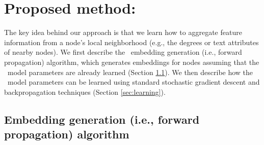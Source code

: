 
\section{Proposed method: \name}


The key idea behind our approach is that we learn how to aggregate feature information from a node's local neighborhood (e.g., the degrees or text attributes of nearby nodes). 
We first describe the  \name\ embedding generation (i.e., forward propagation) algorithm, which generates embeddings for nodes assuming that the \name\ model parameters are already learned (Section \ref{sec:foward}). 
We then describe how the \name\ model parameters can be learned using standard stochastic gradient descent and backpropagation techniques (Section \ref{sec:learning}). 

%

\subsection{Embedding generation (i.e., forward propagation) algorithm}\label{sec:foward} 

